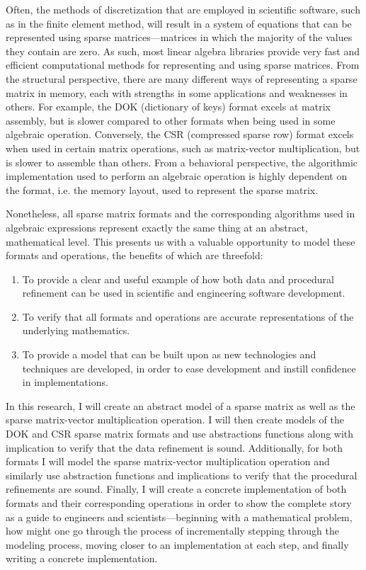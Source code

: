 \documentclass[12pt]{article}
\begin{document}
Often, the methods of discretization that are employed in scientific software, such as in the finite element method, will result in a system of equations that can be represented using sparse matrices---matrices in which the majority of the values they contain are zero.  As such, most linear algebra libraries provide very fast and efficient computational methods for representing and using sparse matrices.  From the structural perspective, there are many different ways of representing a sparse matrix in memory, each with strengths in some applications and weaknesses in others.  For example, the DOK (dictionary of keys) format excels at matrix assembly, but is slower compared to other formats when being used in some algebraic operation.  Conversely, the CSR (compressed sparse row) format excels when used in certain matrix operations, such as matrix-vector multiplication, but is slower to assemble than others.  From a behavioral perspective, the algorithmic implementation used to perform an algebraic operation is highly dependent on the format, i.e. the memory layout, used to represent the sparse matrix.

Nonetheless, all sparse matrix formats and the corresponding algorithms used in algebraic expressions represent exactly the same thing at an abstract, mathematical level.  This presents us with a valuable opportunity to model these formats and operations, the benefits of which are threefold: 

\begin{enumerate}
    \item To provide a clear and useful example of how both data and procedural refinement can be used in scientific and engineering software development.
    \item To verify that all formats and operations are accurate representations of the underlying mathematics.
    \item To provide a model that can be built upon as new technologies and techniques are developed, in order to ease development and instill confidence in implementations.
\end{enumerate}

In this research, I will create an abstract model of a sparse matrix as well as the sparse matrix-vector multiplication operation.  I will then create models of the DOK and CSR sparse matrix formats and use abstractions functions along with implication to verify that the data refinement is sound.  Additionally, for both formats I will model the sparse matrix-vector multiplication operation and similarly use abstraction functions and implications to verify that the procedural refinements are sound.  Finally, I will create a concrete implementation of both formats and their corresponding operations in order to show the complete story as a guide to engineers and scientists---beginning with a mathematical problem, how might one go through the process of incrementally stepping through the modeling process, moving closer to an implementation at each step, and finally writing a concrete implementation.
\end{document}

